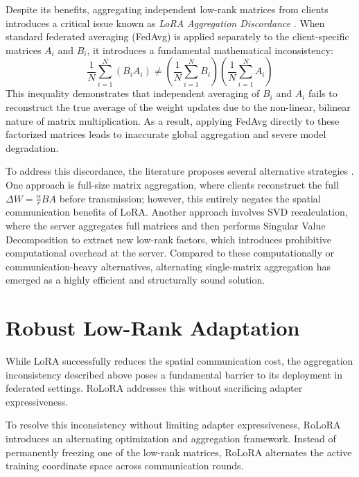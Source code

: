 Despite its benefits, aggregating independent low-rank matrices from clients introduces a critical issue known as \emph{LoRA Aggregation Discordance} \cite{yang2025federated}. When standard federated averaging (FedAvg) is applied separately to the client-specific matrices $A_i$ and $B_i$, it introduces a fundamental mathematical inconsistency:
\begin{equation}
    \frac{1}{N} \sum_{i=1}^{N} (B_i A_i) \neq \left( \frac{1}{N} \sum_{i=1}^{N} B_i \right) \left( \frac{1}{N} \sum_{i=1}^{N} A_i \right)
    \label{eq:lora_inconsistency}
\end{equation}
This inequality demonstrates that independent averaging of $B_i$ and $A_i$ fails to reconstruct the true average of the weight updates due to the non-linear, bilinear nature of matrix multiplication. As a result, applying FedAvg directly to these factorized matrices leads to inaccurate global aggregation and severe model degradation. 

To address this discordance, the literature proposes several alternative strategies \cite{yang2025federated}. One approach is full-size matrix aggregation, where clients reconstruct the full $\Delta W = \frac{\alpha}{r} BA$ before transmission; however, this entirely negates the spatial communication benefits of LoRA. Another approach involves SVD recalculation, where the server aggregates full matrices and then performs Singular Value Decomposition to extract new low-rank factors, which introduces prohibitive computational overhead at the server. Compared to these computationally or communication-heavy alternatives, alternating single-matrix aggregation has emerged as a highly efficient and structurally sound solution.

\section{Robust Low-Rank Adaptation}
\label{sec:rolora}
While LoRA successfully reduces the spatial communication cost, the aggregation inconsistency described above poses a fundamental barrier to its deployment in federated settings. RoLoRA addresses this without sacrificing adapter expressiveness.

To resolve this inconsistency without limiting adapter expressiveness, RoLoRA \cite{chen2025robust} introduces an alternating optimization and aggregation framework. Instead of permanently freezing one of the low-rank matrices, RoLoRA alternates the active training coordinate space across communication rounds.

